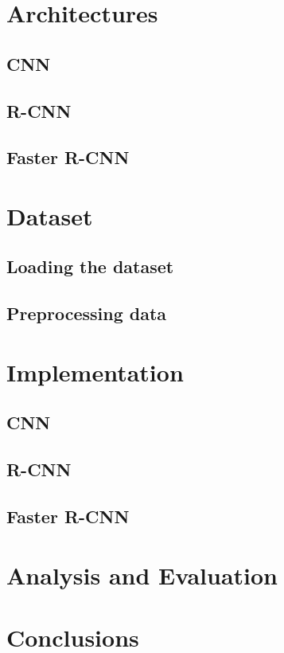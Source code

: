 \documentclass[12pt, landscape]{article}
\begin{document}
\begin{multicols}{3}
\section{Architectures}
\subsection{CNN}
\subsection{R-CNN}
\subsection{Faster R-CNN}
    
\section{Dataset}
\subsection{Loading the dataset}
\subsection{Preprocessing data}

\section{Implementation}
\subsection{CNN}
\subsection{R-CNN}
\subsection{Faster R-CNN}

\section{Analysis and Evaluation}

\section{Conclusions}




\nocite{*}
\end{multicols}
\end{document}
